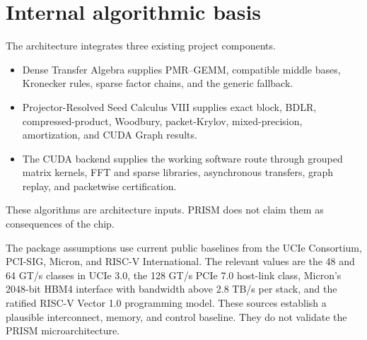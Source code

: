 \documentclass[11pt,oneside,openany]{book}
\theoremstyle{remark}
\begin{document}
\section*{Internal algorithmic basis}
The architecture integrates three existing project components.
\begin{itemize}
\item Dense Transfer Algebra supplies PMR--GEMM, compatible middle bases, Kronecker rules, sparse factor chains, and the generic fallback.
\item Projector-Resolved Seed Calculus VIII supplies exact block, BDLR, compressed-product, Woodbury, packet-Krylov, mixed-precision, amortization, and CUDA Graph results.
\item The CUDA backend supplies the working software route through grouped matrix kernels, FFT and sparse libraries, asynchronous transfers, graph replay, and packetwise certification.
\end{itemize}
These algorithms are architecture inputs. PRISM does not claim them as consequences of the chip.

The package assumptions use current public baselines from the UCIe Consortium, PCI-SIG, Micron, and RISC-V International. The relevant values are the 48 and 64 GT/s classes in UCIe 3.0, the 128 GT/s PCIe 7.0 host-link class, Micron's 2048-bit HBM4 interface with bandwidth above 2.8 TB/s per stack, and the ratified RISC-V Vector 1.0 programming model. These sources establish a plausible interconnect, memory, and control baseline. They do not validate the PRISM microarchitecture.
\end{document}
